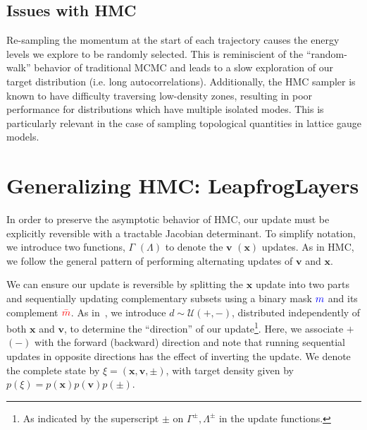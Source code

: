\documentclass[a4paper,11pt]{article}
\newcommand{\x}{\mathbf{x}}
\newcommand{\p}{\mathbf{v}}
\newcommand{\mask}{\textcolor{blue}{{m}}}
\newcommand{\maskbar}{\textcolor{red}{\bar{m}}}
\begin{document}
\subsection{\label{subsec:hmc_issues}Issues with HMC}
%
Re-sampling the momentum at the start of each trajectory causes the energy
levels we explore to be randomly selected.
%
This is reminiscient of the ``random-walk'' behavior of traditional MCMC and
leads to a slow exploration of our target distribution (i.e. long
autocorrelations).
%
Additionally, the HMC sampler is known to have difficulty traversing
low-density zones, resulting in poor performance for distributions which have
multiple isolated modes.
%
This is particularly relevant in the case of sampling topological quantities in
lattice gauge models.
%
\section{\label{sec:l2hmc}Generalizing HMC: LeapfrogLayers}
%
In order to preserve the asymptotic behavior of HMC, our update must be
explicitly reversible with a tractable Jacobian determinant.
%
To simplify notation, we introduce two functions, \(\Gamma\) \((\Lambda)\) to
denote the \(\p\) \((\x)\) updates.
%
As in HMC, we follow the general pattern of performing alternating updates of
\(\p\) and \(\x\).
%

We can ensure our update is reversible by splitting the \(\x\) update into two
parts and sequentially updating complementary subsets using a binary mask
\(\mask\) and its complement \(\maskbar\).
%
As in~\cite{%
  2017arXiv171109268L,%
  Foreman:2021ixr%
}, we introduce \(d \sim \mathcal{U} (+, -)\), distributed independently of
both \(\x\) and \(\p\), to determine the ``direction'' of our update\footnote{%
  As indicated by the superscript \(\pm\) on \(\Gamma^{\pm}, \Lambda^{\pm}\) in
  the update functions.
}.
%
Here, we associate \(+\) \((-)\) with the forward (backward) direction and note
that running sequential updates in opposite directions has the effect of
inverting the update.
%
We denote the complete state by \(\xi = (\x, \p, \pm)\), with target density
given by \(p(\xi) = p(\x) p(\p) p(\pm)\).
%
\end{document}
